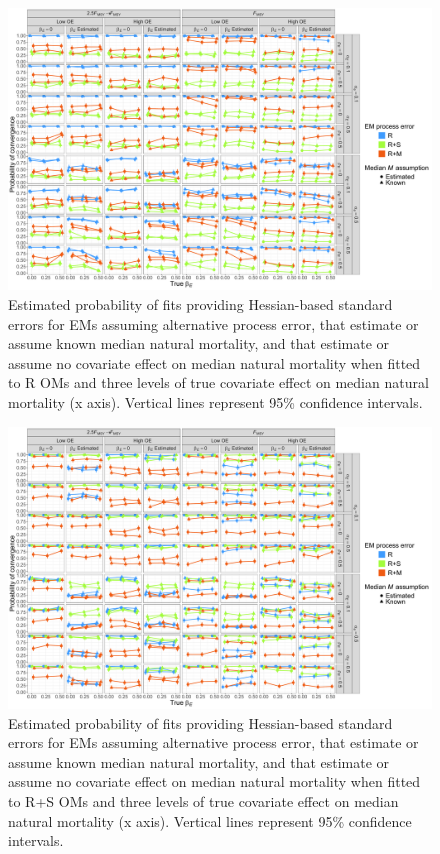 \documentclass[
  12pt,
]{article}
\begin{document}
\begin{landscape}
\begin{figure}
\begin{center}
\includegraphics{convergence_Rom}
\end{center}
\caption{Estimated probability of fits providing Hessian-based standard errors for EMs assuming alternative process error, that estimate or assume known median natural mortality, and that estimate or assume no covariate effect on median natural mortality when fitted to R OMs and three levels of true covariate effect on median natural mortality (x axis). Vertical lines represent 95\% confidence intervals.}\label{convergence_Rom}
\end{figure}
\end{landscape}

\begin{landscape}
\begin{figure}
\begin{center}
\includegraphics{convergence_RSom}
\end{center}
\caption{Estimated probability of fits providing Hessian-based standard errors for EMs assuming alternative process error, that estimate or assume known median natural mortality, and that estimate or assume no covariate effect on median natural mortality when fitted to R+S OMs and three levels of true covariate effect on median natural mortality (x axis). Vertical lines represent 95\% confidence intervals.}\label{convergence_RSom}
\end{figure}
\end{landscape}
\end{document}
